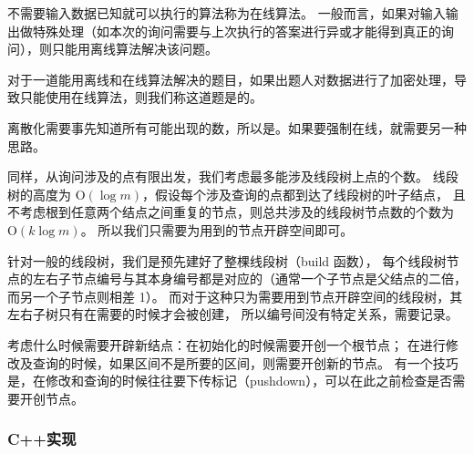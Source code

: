\begin{definition}[在线算法] \label{def:online algorithm}
  \hspace{2em}不需要输入数据已知就可以执行的算法称为在线算法。
  一般而言，如果对输入输出做特殊处理（如本次的询问需要与上次执行的答案进行异或才能得到真正的询问），则只能用离线算法解决该问题。

  \hspace{2em}对于一道能用离线和在线算法解决的题目，如果出题人对数据进行了加密处理，导致只能使用在线算法，则我们称这道题是{}的。
\end{definition}

离散化需要事先知道所有可能出现的数，所以是{}。如果要强制在线，就需要另一种思路。

同样，从询问涉及的点有限出发，我们考虑最多能涉及线段树上点的个数。
线段树的高度为 $\mathrm{O}(\log m)$，假设每个涉及查询的点都到达了线段树的叶子结点，
且不考虑根到任意两个结点之间重复的节点，则总共涉及的线段树节点数的个数为 $\mathrm{O}(k\log m)$。
所以我们只需要为用到的节点开辟空间即可。

针对一般的线段树，我们是预先建好了整棵线段树（build 函数），
每个线段树节点的左右子节点编号与其本身编号都是对应的（通常一个子节点是父结点的二倍，而另一个子节点则相差 1）。
而对于这种只为需要用到节点开辟空间的线段树，其左右子树只有在需要的时候才会被创建，
所以编号间没有特定关系，需要记录。

考虑什么时候需要开辟新结点：在初始化的时候需要开创一个根节点；
在进行修改及查询的时候，如果区间不是所要的区间，则需要开创新的节点。
有一个技巧是，在修改和查询的时候往往要下传标记（pushdown），可以在此之前检查是否需要开创节点。

\subsubsection{C++实现}



